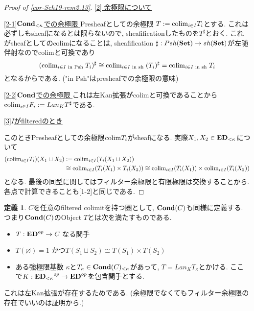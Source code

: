 \documentclass[dvipdfmx,a4paper,11pt]{article}
\newcommand{\colim}{{\rm colim}}
\theoremstyle{definition}
\newtheorem{dfn}[thm]{定義}
\begin{document}
\begin{proof}[Proof of \ref{cor-Sch19-rem2.13}]
\underline{ [2] 余極限について }

\underline{[2-1]${\bf Cond}_{< \kappa}$での余極限 }
Presheafとしての余極限
$T:=\colim_{i \in I}T_i$とする.
 これは必ずしもsheafになるとは限らないので, sheafificationしたものを$T^{\sharp}$とおく.
 これがsheafとしてのcolimになることは, sheafification
 $\sharp : Psh({\bf Set}) \to sh({\bf Set}) $が左随伴射なのでcolimと可換であり
 $$
 (\colim_{i \in I \text{ in Psh }}T_i)^{\sharp} \cong \colim_{i \in I \text{ in sh }}(T_i)^{\sharp}=\colim_{i \in I \text{ in sh }}T_i
 $$
 となるからである. ("in Psh"はpresheafでの余極限の意味)
 
 \underline{[2-2]${\bf Cond}$での余極限 }
 これは左Kan拡張がcolimと可換であることから$\colim_{i \in I}F_i := Lan_{K}T^{\sharp}$である. 

\underline{ [3]$I$がfilteredのとき }
 
このときPresheafとしての余極限$\colim T_i$がsheafになる. 
 実際$X_1, X_2 \in {\bf ED}_{< \kappa}$について
\begin{align*}
\begin{split}
(\colim_{i \in I}T_i)(X_1 \sqcup  X_2 ) 
&:= \colim_{i \in I}(T_i(X_1\sqcup X_2)) \\
&\cong 
\colim_{i \in I}(T_i(X_1)\times T_i( X_2))
\cong
\colim_{i \in I}(T_i(X_1))\times \colim_{i \in I}(T_i( X_2))
\end{split}
\end{align*}
となる. 最後の同型に関してはフィルター余極限と有限極限は交換することから.
 各点で計算できることも[1-2]と同じである. 
\end{proof}

 \begin{tcolorbox}
 [colback = white, colframe = green!35!black, fonttitle = \bfseries,breakable = true]
 \begin{dfn}
$C$を任意のfiltered colimitを持つ圏として, ${\bf Cond}(C)$も同様に定義する.
つまり${\bf Cond}(C)$のObject $T$とは次を満たすものである.
\begin{itemize}
\item $T : {\bf ED}^{op} \to C$ なる関手
\item $T(\varnothing)=1$ かつ$T(S_1\sqcup S_2) \cong T(S_1) \times T(S_2)$
\item ある強極限基数 $\kappa$と$T_{\kappa} \in {\bf Cond}(C)_{< \kappa}$があって, $T = Lan_{K}T_{\kappa}$とかける. ここで$K : {{\bf ED}_{<\kappa}}^{op} \to {\bf ED}^{op}$を包含関手とする.
\end{itemize}

 \end{dfn}
 \end{tcolorbox}
これは左Kan拡張が存在するためである. (余極限でなくてもフィルター余極限の存在でいいのは証明から.)
\end{document}
